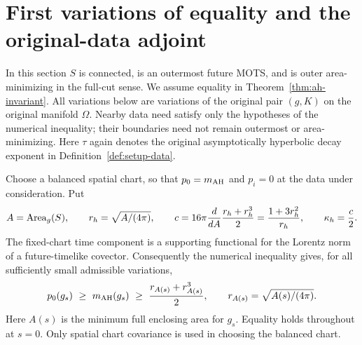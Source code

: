 \section{First variations of equality and the original-data adjoint}
\label{eq-section}

In this section \(S\) is connected, is an outermost future MOTS, and is
outer area-minimizing in the full-cut sense.  We assume equality in
Theorem~\ref{thm:ah-invariant}.  All variations below are variations of the
original pair \((g,K)\) on the original manifold \(\Omega\).  Nearby data
need satisfy only the hypotheses of the numerical inequality; their
boundaries need not remain outermost or area-minimizing.
Here \(\tau\) again denotes the original asymptotically hyperbolic decay
exponent in Definition~\ref{def:setup-data}.

Choose a balanced spatial chart, so that \(p_0=m_{\rm AH}\) and \(p_i=0\)
at the data under consideration.  Put
\begin{equation}
 A=\operatorname{Area}_g(S),\qquad r_h=\sqrt{A/(4\pi)},\qquad
 c=16\pi\frac{d}{dA}\frac{r_h+r_h^3}{2}
   =\frac{1+3r_h^2}{r_h},\qquad \kappa_h=\frac c2 .
 \label{eq-area-constant}
\end{equation}
The fixed-chart time component is a supporting functional for the
Lorentz norm of a future-timelike covector.  Consequently the numerical
inequality gives, for all sufficiently small admissible variations,
\begin{equation}
 p_0(g_s)\ \geq\ m_{\rm AH}(g_s)\
 \geq\ \frac{r_{A(s)}+r_{A(s)}^3}{2},
 \qquad r_{A(s)}=\sqrt{A(s)/(4\pi)}.
 \label{eq-supporting-inequality}
\end{equation}
Here \(A(s)\) is the minimum full enclosing area for \(g_s\).  Equality
holds throughout at \(s=0\).  Only spatial chart covariance is used in
choosing the balanced chart.

